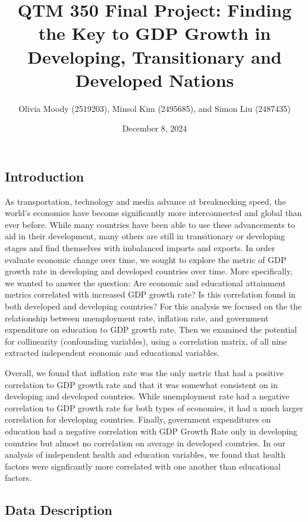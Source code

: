 \documentclass[
  letterpaper,
  DIV=11,
  numbers=noendperiod]{scrartcl}
\title{QTM 350 Final Project: Finding the Key to GDP Growth in
Developing, Transitionary and Developed Nations}
\author{Olivia Moody (2519203), Minsol Kim (2495685), and Simon Liu
(2487435)}
\date{December 8, 2024}
\begin{document}
\maketitle


\subsection{Introduction}\label{introduction}

As transportation, technology and media advance at breaknecking speed,
the world's economies have become significantly more interconnected and
global than ever before. While many countries have been able to use
these advancements to aid in their development, many others are still in
transitionary or developing stages and find themselves with imbalanced
imports and exports. In order evaluate economic change over time, we
sought to explore the metric of GDP growth rate in developing and
developed countries over time. More specifically, we wanted to answer
the question: Are economic and educational attainment metrics correlated
with increased GDP growth rate? Is this correlation found in both
developed and developing countries? For this analysis we focused on the
the relationship between unemployment rate, inflation rate, and
government expenditure on education to GDP growth rate. Then we examined
the potential for collinearity (confounding variables), using a
correlation matrix, of all nine extracted independent economic and
educational variables.

Overall, we found that inflation rate was the only metric that had a
positive correlation to GDP growth rate and that it was somewhat
consistent on in developing and developed countries. While unemployment
rate had a negative correlation to GDP growth rate for both types of
economies, it had a much larger correlation for developing countries.
Finally, government expenditures on education had a negative correlation
with GDP Growth Rate only in developing countries but almost no
correlation on average in developed countries. In our analysis of
independent health and education variables, we found that health factors
were signficantly more correlated with one another than educational
factors.

\subsection{Data Description}\label{data-description}
\end{document}
